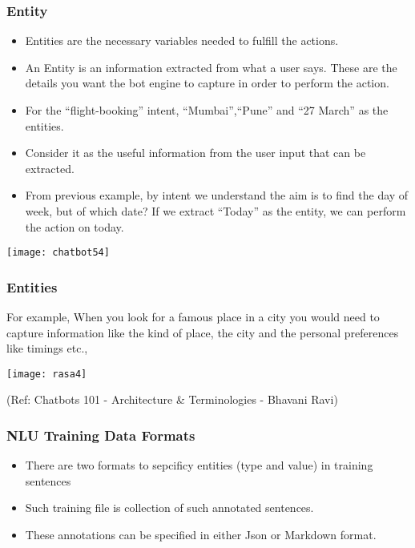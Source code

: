  \begin{frame}[fragile]\frametitle{Entity}
\begin{itemize}
\item Entities are the necessary variables needed to fulfill the actions.
\item An Entity is an information extracted from what a user says. These are the details you want the bot engine to capture in order to perform the action.
\item For the ``flight-booking'' intent, ``Mumbai'',``Pune'' and ``27 March'' as the entities. 
\item Consider it as the useful information from the user input that can be extracted. 
\item From previous example, by intent we understand the aim is to find the day of week, but of which date? If we extract ``Today'' as the entity, we can perform the action on today.
\end{itemize}

\begin{center}
\texttt{[image: chatbot54]}
\end{center}

\end{frame}

 \begin{frame}[fragile]\frametitle{Entities}
For example, When you look for a famous place in a city you would need to capture information like the kind of place, the city and the personal preferences like timings etc.,


\begin{center}
\texttt{[image: rasa4]}
\end{center}

{\tiny (Ref: Chatbots 101 - Architecture \& Terminologies -  Bhavani Ravi)}

\end{frame}


 \begin{frame}[fragile]\frametitle{NLU Training Data Formats}
\begin{itemize}
\item There are two formats to sepcificy entities (type and value) in training sentences
\item Such training file is collection of such annotated sentences.
\item These annotations can be specified in either Json or Markdown format.
\end{itemize}

\end{frame}


